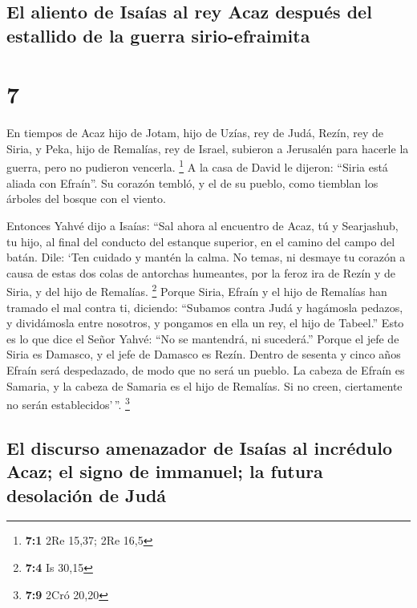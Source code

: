 \hypertarget{el-aliento-de-isauxedas-al-rey-acaz-despuuxe9s-del-estallido-de-la-guerra-sirio-efraimita}{%
\subsection{El aliento de Isaías al rey Acaz después del estallido de la
guerra
sirio-efraimita}\label{el-aliento-de-isauxedas-al-rey-acaz-despuuxe9s-del-estallido-de-la-guerra-sirio-efraimita}}

\hypertarget{section-6}{%
\section{7}\label{section-6}}

 En tiempos de Acaz hijo de Jotam, hijo de Uzías, rey de
Judá, Rezín, rey de Siria, y Peka, hijo de Remalías, rey de Israel,
subieron a Jerusalén para hacerle la guerra, pero no pudieron vencerla.
\footnote{\textbf{7:1} 2Re 15,37; 2Re 16,5}  A la casa de
David le dijeron: ``Siria está aliada con Efraín''. Su corazón tembló, y
el de su pueblo, como tiemblan los árboles del bosque con el viento.

 Entonces Yahvé dijo a Isaías: ``Sal ahora al encuentro de
Acaz, tú y Searjashub, tu hijo, al final del conducto del estanque
superior, en el camino del campo del batán.  Dile: `Ten
cuidado y mantén la calma. No temas, ni desmaye tu corazón a causa de
estas dos colas de antorchas humeantes, por la feroz ira de Rezín y de
Siria, y del hijo de Remalías. \footnote{\textbf{7:4} Is 30,15}
 Porque Siria, Efraín y el hijo de Remalías han tramado el
mal contra ti, diciendo:  ``Subamos contra Judá y
hagámosla pedazos, y dividámosla entre nosotros, y pongamos en ella un
rey, el hijo de Tabeel.''  Esto es lo que dice el Señor
Yahvé: ``No se mantendrá, ni sucederá.''  Porque el jefe
de Siria es Damasco, y el jefe de Damasco es Rezín. Dentro de sesenta y
cinco años Efraín será despedazado, de modo que no será un pueblo.
 La cabeza de Efraín es Samaria, y la cabeza de Samaria es
el hijo de Remalías. Si no creen, ciertamente no serán
establecidos'\,''. \footnote{\textbf{7:9} 2Cró 20,20}

\hypertarget{el-discurso-amenazador-de-isauxedas-al-incruxe9dulo-acaz-el-signo-de-immanuel-la-futura-desolaciuxf3n-de-juduxe1}{%
\subsection{El discurso amenazador de Isaías al incrédulo Acaz; el signo
de immanuel; la futura desolación de
Judá}\label{el-discurso-amenazador-de-isauxedas-al-incruxe9dulo-acaz-el-signo-de-immanuel-la-futura-desolaciuxf3n-de-juduxe1}}

